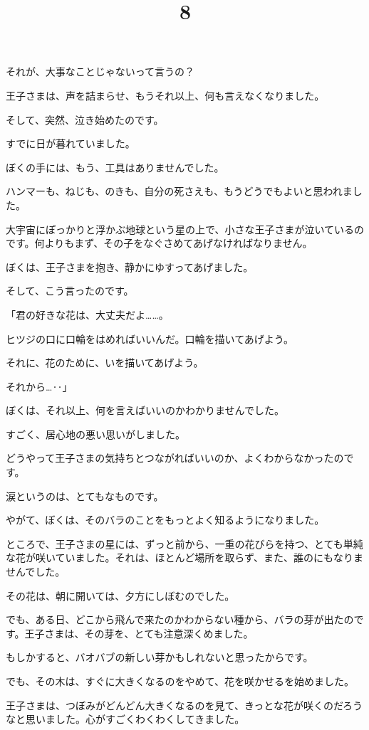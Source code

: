 それが、大事なことじゃないって言うの？

王子さまは、声を詰まらせ、もうそれ以上、何も言えなくなりました。

そして、突然、泣き始めたのです。

すでに日が暮れていました。

ぼくの手には、もう、工具はありませんでした。

ハンマーも、ねじも、のきも、自分の死さえも、もうどうでもよいと思われました。

大宇宙にぽっかりと浮かぶ地球という星の上で、小さな王子さまが泣いているのです。何よりもまず、その子をなぐさめてあげなければなりません。

ぼくは、王子さまを抱き、静かにゆすってあげました。

そして、こう言ったのです。

「君の好きな花は、大丈夫だよ……。

ヒツジの口に口輪をはめればいいんだ。口輪を描いてあげよう。

それに、花のために、いを描いてあげよう。

それから…‥」

ぼくは、それ以上、何を言えばいいのかわかりませんでした。

すごく、居心地の悪い思いがしました。

どうやって王子さまの気持ちとつながればいいのか、よくわからなかったのです。

涙というのは、とてもなものです。

\title{8}

やがて、ぼくは、そのバラのことをもっとよく知るようになりました。

ところで、王子さまの星には、ずっと前から、一重の花びらを持つ、とても単純な花が咲いていました。それは、ほとんど場所を取らず、また、誰のにもなりませんでした。

その花は、朝に開いては、夕方にしぼむのでした。

でも、ある日、どこから飛んで来たのかわからない種から、バラの芽が出たのです。王子さまは、その芽を、とても注意深くめました。

もしかすると、バオバブの新しい芽かもしれないと思ったからです。

でも、その木は、すぐに大きくなるのをやめて、花を咲かせるを始めました。

王子さまは、つぼみがどんどん大きくなるのを見て、きっとな花が咲くのだろうなと思いました。心がすごくわくわくしてきました。

